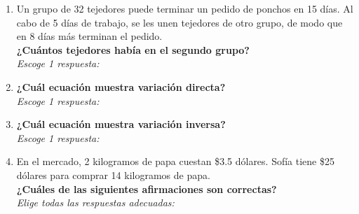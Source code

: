 \documentclass[11pt]{book}
\begin{document}
\begin{enumerate}
  \item Un grupo de 32 tejedores puede terminar un pedido de ponchos en 15 días. Al cabo de 5 días de trabajo, se les unen tejedores de otro grupo, de modo que en 8 días más terminan el pedido.\\
        \textbf{¿Cuántos tejedores había en el segundo grupo?}\\
        \emph{Escoge 1 respuesta:}


  \item \textbf{¿Cuál ecuación muestra variación directa?}\\
        \emph{Escoge 1 respuesta:}


  \item \textbf{¿Cuál ecuación muestra variación inversa?}\\
        \emph{Escoge 1 respuesta:}


  \item En el mercado, 2 kilogramos de papa cuestan \$3.5 dólares.
        Sofía tiene \$25 dólares para comprar 14 kilogramos de papa.\\
        \textbf{¿Cuáles de las siguientes afirmaciones son correctas?}\\
        \emph{Elige todas las respuestas adecuadas:}


\end{enumerate}
\end{document}
